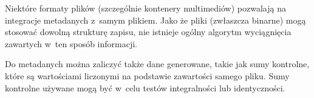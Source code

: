 \par
Niektóre formaty plików (szczególnie kontenery multimediów) pozwalają na integracje metadanych z~samym plikiem. Jako że pliki (zwłaszcza binarne) mogą stosować dowolną strukturę zapisu, nie istnieje ogólny algorytm wyciągnięcia zawartych w~ten sposób informacji.

\par
Do metadanych można zaliczyć także dane generowane, takie jak sumy kontrolne, które są wartościami liczonymi na podstawie zawartości samego pliku. Sumy kontrolne używane mogą być w~celu testów integralności lub identyczności.
